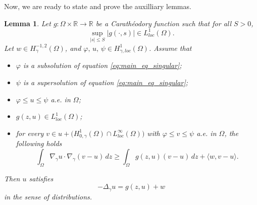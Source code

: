 \documentclass[11pt]{article}
\newtheorem{lemma}{Lemma}[section] %
\newcommand{\om} {\Omega}
\newcommand{\gradgr}{\nabla_{\gamma}}
\newcommand{\spacegr}{H^{1}_{0,\gamma}(\Omega)}
\begin{document}
Now, we are ready to state and prove the auxilliary lemmas. 
\begin{lemma}
\label{lem:variational-identity}
Let $g : \Omega \times \mathbb{R} \to \mathbb{R}$ be a Carath\'{e}odory function such that for all $S > 0$,
\begin{equation*}
\sup_{|s|\le S} |g(\cdot,s)| \in L^1_{loc}(\Omega).
\end{equation*}
Let $w \in H^{-1,2}_{\gamma}(\Omega)$, and $\varphi,\, u,\, \psi \in  H^{1}_{\gamma, loc}(\Omega)$. Assume that
\begin{itemize}
\item $\varphi$ is a subsolution of equation \eqref{eq:main_eq_singular};
\item $\psi$ is a supersolution of equation \eqref{eq:main_eq_singular};
\item$\varphi \le u \le \psi$ a.e. in $\om$;
\item$g(z,u) \in L^1_{loc}(\Omega)$;
\item for every $v \in u + \bigl( \spacegr \cap L^\infty_{loc}(\Omega) \bigr)$ with $\varphi \le v \le \psi$ a.e. in $\om$, the following holds
\begin{equation}\label{ineq:min_on_convex}
\int_\Omega
\gradgr u \cdot \gradgr (v-u)\,dz
\ge
\int_\Omega
g(z,u)(v-u)\,dz
+
\langle w , v-u \rangle.
\end{equation}
\end{itemize}
Then $u$ satisfies
\begin{equation*}
- \Delta_{\gamma} u = g(z,u) + w
\end{equation*}
in the sense of distributions. 
\end{lemma}
\end{document}
